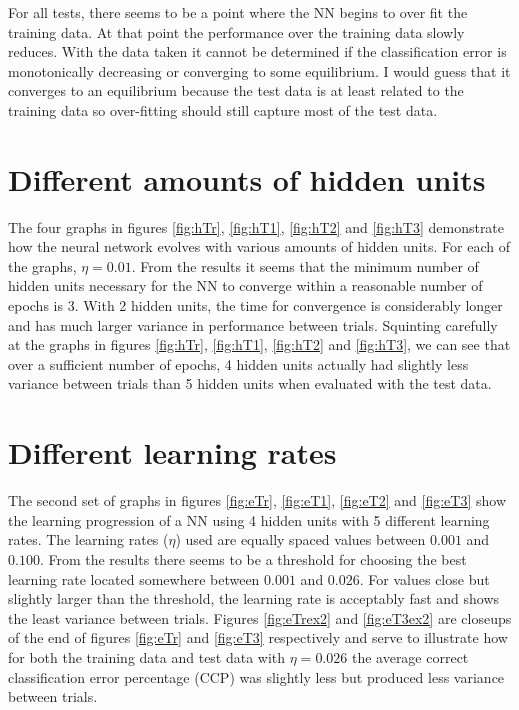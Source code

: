 \documentclass[letterpaper, 11 pt]{article}
\begin{document}
For all tests, there seems to be a point where the NN begins to over fit the training
data.  At that point the performance over the training data slowly reduces.  With
the data taken it cannot be determined if the classification error is monotonically
decreasing or converging to some equilibrium.  I would guess that it converges
to an equilibrium because the test data is at least related to the training data
so over-fitting should still capture most of the test data.

\section{Different amounts of hidden units}

The four graphs in figures \ref{fig:hTr}, \ref{fig:hT1}, \ref{fig:hT2} and \ref{fig:hT3}
demonstrate how the neural network evolves with various amounts of hidden units.
For each of the graphs, $\eta=0.01$.  From the results it seems that the minimum
number of hidden units necessary for the NN to converge within a reasonable number
of epochs is 3.  With 2 hidden units, the time for convergence is considerably longer
and has much larger variance in performance between trials.  Squinting carefully
at the graphs in figures \ref{fig:hTr}, \ref{fig:hT1}, \ref{fig:hT2} and \ref{fig:hT3},
we can see that over a sufficient number of epochs, 4 hidden units actually had
slightly less variance between trials than 5 hidden units when evaluated with the
test data.

\section{Different learning rates}

The second set of graphs in figures \ref{fig:eTr}, \ref{fig:eT1}, \ref{fig:eT2} and \ref{fig:eT3}
show the learning progression of a NN using 4 hidden units with 5 different learning rates.
The learning rates ($\eta$) used are equally spaced values between $0.001$ and $0.100$.
From the results there seems to be a threshold for choosing the best learning rate
located somewhere between $0.001$ and $0.026$.  For values close but slightly larger
than the threshold, the learning rate is acceptably fast and shows the least variance
between trials.  Figures \ref{fig:eTrex2} and \ref{fig:eT3ex2} are closeups of the
end of figures \ref{fig:eTr} and \ref{fig:eT3} respectively and serve to illustrate
how for both the training data and test data with $\eta=0.026$ the average correct
classification error percentage (CCP) was slightly less but produced less variance
between trials.
\end{document}
